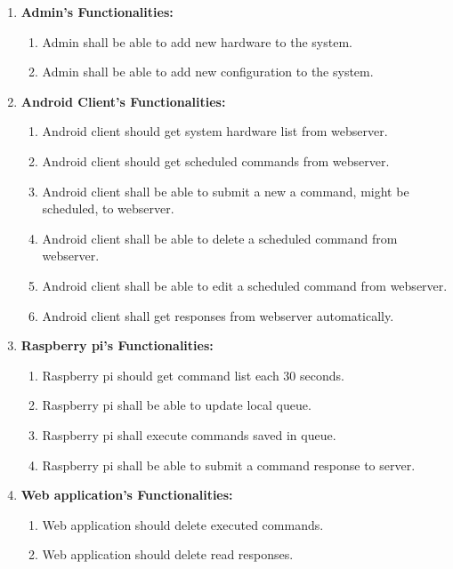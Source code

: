 \documentclass[12pt, oneside, a4paper]{book}
\newcommand\boldcolor[1]{\textcolor{bold}{\textbf{#1}}}
\begin{document}
				\begin{enumerate}[label=3.2.3.\arabic*]
					\item \boldcolor{Admin's Functionalities:}
					\begin{enumerate}
						\item Admin shall be able to add new hardware to the system.
						\item Admin shall be able to add new configuration to the system.
					\end{enumerate}
					\item \boldcolor{Android Client's Functionalities:}
					\begin{enumerate}
						\item Android client should get system hardware list from webserver.
						\item Android client should get scheduled commands from webserver.
						\item Android client shall be able to submit a new a command, might be scheduled,
						to webserver.	
						\item Android client shall be able to delete a scheduled command from webserver.
						\item Android client shall be able to edit a scheduled command from webserver.
						\item Android client shall get responses from webserver automatically.
					\end{enumerate}
					\item \boldcolor{Raspberry pi's Functionalities:}
					\begin{enumerate}
						\item Raspberry pi should get command list each 30 seconds.
						\item Raspberry pi shall be able to update local queue.
						\item Raspberry pi shall execute commands saved in queue.
						\item Raspberry pi shall be able to submit a command response to server.
					\end{enumerate}
					\item \boldcolor{Web application's Functionalities:}
					\begin{enumerate}
						\item Web application should delete executed commands.
						\item Web application should delete read responses.
					\end{enumerate}
				\end{enumerate}
\end{document}
